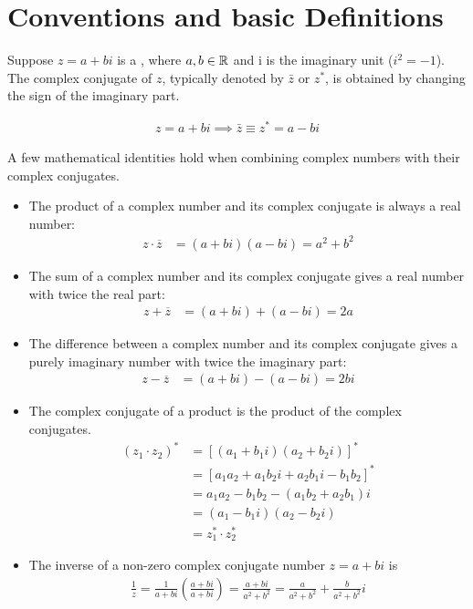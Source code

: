 \section{Conventions and basic Definitions}

\begin{defn}{1}
Suppose $z=a+bi$ is a , where $a,b\in{\mathbb R}$ and i is the imaginary unit ($i^2=-1$). The complex conjugate of $z$, typically denoted by $\bar{z}$ or $z^*$, is obtained by changing the sign of the imaginary part.

\begin{align}
z=a+bi \implies	\bar{z} \equiv z^* = a - bi 
\end{align}
\end{defn}

A few mathematical identities hold when combining complex numbers with their complex conjugates.

\begin{itemize}
	\item The product of a complex number and its complex conjugate is always a real number:
	\begin{align}
		z \cdot \overline{z} &= (a+bi)(a-bi) = a^2 + b^2
	\end{align}
	
	\item The sum of a complex number and its complex conjugate gives a real number with twice the real part:
	\begin{align}
		z + \overline{z} &= (a+bi) + (a-bi) = 2a
	\end{align}
	
	\item The difference between a complex number and its complex conjugate gives a purely imaginary number with twice the imaginary part:
	\begin{align}
		z - \overline{z} &= (a+bi) - (a-bi) = 2bi
	\end{align}

	\item The complex conjugate of a product is the product of the complex conjugates.
	\begin{align}
		(z_1 \cdot z_2)^* &= [(a_1+b_1i)(a_2+b_2i)]^* \\ &= [a_1a_2+a_1b_2i+a_2b_1i-b_1b_2]^* \\ &= a_1a_2-b_1b_2 - (a_1b_2+a_2b_1)i \\ &= (a_1-b_1i)(a_2-b_2i) \\
		&= z_1^* \cdot z_2^*
	\end{align}

	\item The inverse of a non-zero complex conjugate number $z=a+bi$ is
	\begin{align}
		\frac{1}{z} = \frac{1}{a+bi}\left(\frac{a+bi}{a+bi}\right) = \frac{a+bi}{a^2+b^2} = \frac{a}{a^2+b^2} + \frac{b}{a^2+b^2}i
	\end{align}
\end{itemize}


